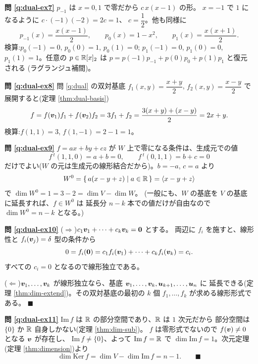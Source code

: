 \bigskip
\noindent\textbf{問 \ref{q:dual-ex7}}\quad
$p_{-1}$ は $x = 0, 1$ で零だから $c\,x(x - 1)$ の形。
$x = -1$ で $1$ になるように $c \cdot (-1)(-2) = 2c = 1$、
$c = \dfrac{1}{2}$。他も同様に
\[
p_{-1}(x) = \frac{x(x - 1)}{2}, \qquad p_0(x) = 1 - x^2, \qquad
p_1(x) = \frac{x(x + 1)}{2}.
\]
検算:$p_0(-1) = 0$, $p_0(0) = 1$, $p_0(1) = 0$;
$p_1(-1) = 0$, $p_1(0) = 0$, $p_1(1) = 1$。任意の $p \in \mathbb{R}[x]_2$ は
$p = p(-1)p_{-1} + p(0)p_0 + p(1)p_1$ と復元される
(ラグランジュ補間)。

\bigskip
\noindent\textbf{問 \ref{q:dual-ex8}}\quad
問 \ref{q:dual} の双対基底 $f_1(x, y) = \dfrac{x + y}{2}$,
$f_2(x, y) = \dfrac{x - y}{2}$ で展開すると(定理 \ref{thm:dual-basis})
\[
f = f(\bm{v}_1)f_1 + f(\bm{v}_2)f_2 = 3f_1 + f_2
= \frac{3(x + y) + (x - y)}{2} = 2x + y.
\]
検算:$f(1, 1) = 3$, $f(1, -1) = 2 - 1 = 1$。

\bigskip
\noindent\textbf{問 \ref{q:dual-ex9}}\quad
$f = ax + by + cz$ が $W$ 上で零になる条件は、生成元での値
\[
f\,{}^t(1, 1, 0) = a + b = 0, \qquad f\,{}^t(0, 1, 1) = b + c = 0
\]
だけでよい($W$ の元は生成元の線形結合だから)。$b = -a$, $c = a$ より
\[
W^{0} = \{\, a(x - y + z) \mid a \in \mathbb{R} \,\} = \langle x - y + z \rangle
\]
で $\dim W^{0} = 1 = 3 - 2 = \dim V - \dim W$。
(一般にも、$W$ の基底を $V$ の基底に延長すれば、$f \in W^{0}$ は
延長分 $n - k$ 本での値だけが自由なので $\dim W^{0} = n - k$ となる。)

\bigskip
\noindent\textbf{問 \ref{q:dual-ex10}}\quad
($\Rightarrow$)$c_1\bm{v}_1 + \cdots + c_k\bm{v}_k = \bm{0}$ とする。
両辺に $f_i$ を施すと、線形性と $f_i(\bm{v}_j) = \delta$ 型の条件から
\[
0 = f_i(\bm{0}) = c_1 f_i(\bm{v}_1) + \cdots + c_k f_i(\bm{v}_k) = c_i.
\]
すべての $c_i = 0$ となるので線形独立である。

($\Leftarrow$)$\bm{v}_1, \dots, \bm{v}_k$ が線形独立なら、基底
$\bm{v}_1, \dots, \bm{v}_k, \bm{u}_{k+1}, \dots, \bm{u}_n$ に
延長できる(定理 \ref{thm:dim-extend})。その双対基底の最初の $k$ 個
$f_1, \dots, f_k$ が求める線形形式である。 $\blacksquare$

\bigskip
\noindent\textbf{問 \ref{q:dual-ex11}}\quad
$\mathrm{Im}\,f$ は $\mathbb{R}$ の部分空間であり、$\mathbb{R}$ は $1$ 次元だから
部分空間は $\{0\}$ か $\mathbb{R}$ 自身しかない(定理 \ref{thm:dim-sub})。
$f$ は零形式でないので $f(\bm{v}) \neq 0$ となる $\bm{v}$ が存在し、
$\mathrm{Im}\,f \neq \{0\}$、よって $\mathrm{Im}\,f = \mathbb{R}$ で
$\dim \mathrm{Im}\,f = 1$。次元定理(定理 \ref{thm:dimension})より
\[
\dim \mathrm{Ker}\,f = \dim V - \dim \mathrm{Im}\,f = n - 1. \qquad\blacksquare
\]

